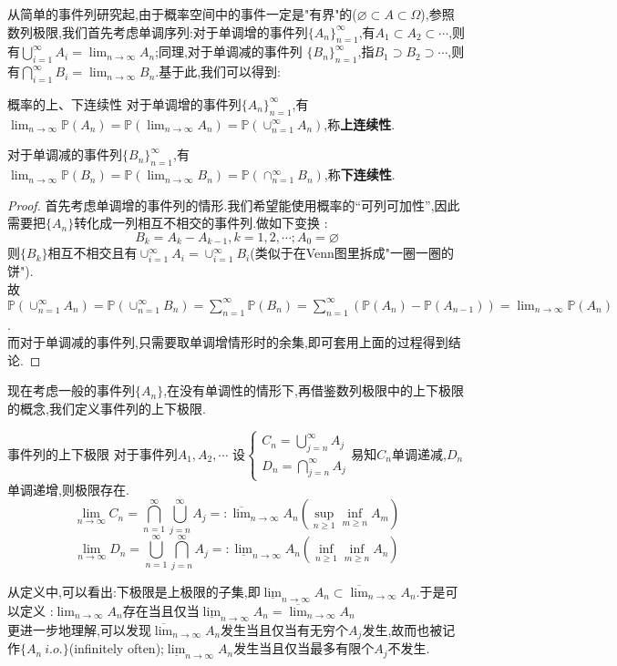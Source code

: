 \documentclass[lang=cn,10pt]{elegantbook}
\begin{document}
从简单的事件列研究起,由于概率空间中的事件一定是"有界"的($\varnothing \subset A\subset \Omega$),参照数列极限,我们首先考虑单调序列:对于单调增的事件列$\{A_n\}_{n=1}^{\infty}$,有$A_1\subset A_2\subset \cdots$,则有$\bigcup_{i=1}^{\infty}A_i=\lim_{n\to\infty}A_n$;同理,对于单调减的事件列
$\{B_n\}_{n=1}^{\infty}$,指$B_1\supset B_2\supset \cdots$,则有$\bigcap_{i=1}^{\infty}B_i=\lim_{n\to\infty}B_n$.基于此,我们可以得到:
\begin{theorem}{概率的上、下连续性}{}
    对于单调增的事件列$\{A_n\}_{n=1}^{\infty}$,有$\lim_{n\to\infty}\mathbb{P}(A_n)=\mathbb{P}(\lim_{n\to\infty}A_n)=\mathbb{P}(\cup_{n=1}^{\infty}A_n)$,称\textbf{上连续性}.

    对于单调减的事件列$\{B_n\}_{n=1}^{\infty}$,有$\lim_{n\to\infty}\mathbb{P}(B_n)=\mathbb{P}(\lim_{n\to\infty}B_n)=\mathbb{P}(\cap_{n=1}^{\infty}B_n)$,称\textbf{下连续性}.
\end{theorem}
\begin{proof}
    首先考虑单调增的事件列的情形.我们希望能使用概率的“可列可加性”,因此需要把$\{A_n\}$转化成一列相互不相交的事件列.做如下变换 :
    $$B_k=A_k-A_{k-1},k=1,2,\cdots;A_0=\varnothing$$
    则$\{B_k\}$相互不相交且有$\cup_{i=1}^{\infty}{A_i}=\cup_{i=1}^{\infty}B_i$(类似于在Venn图里拆成"一圈一圈的饼").\\
    故$\mathbb{P}(\cup_{n=1}^{\infty}A_n)=\mathbb{P}(\cup_{n=1}^{\infty}B_n)=\sum_{n=1}^{\infty}\mathbb{P}(B_n)=\sum_{n=1}^{\infty}(\mathbb{P}(A_{n})-\mathbb{P}(A_{n-1}))=\lim_{n\to\infty}\mathbb{P}(A_n)$.\\
    而对于单调减的事件列,只需要取单调增情形时的余集,即可套用上面的过程得到结论.
\end{proof}

现在考虑一般的事件列$\{A_n\}$,在没有单调性的情形下,再借鉴数列极限中的上下极限的概念,我们定义事件列的上下极限.
\begin{definition}{事件列的上下极限}{}
    对于事件列$A_1,A_2,\cdots$
    设$\left\{\begin{aligned}C_n=\bigcup_{j=n}^{\infty}A_j\\D_n=\bigcap_{j=n}^{\infty}A_j\end{aligned}\right.$易知$C_n$单调递减,$D_n$单调递增,则极限存在.
   $$\lim_{n\to\infty}C_n=\bigcap_{n=1}^{\infty}\bigcup_{j=n}^{\infty}A_j=:\overline{\lim}_{n\to \infty}A_n(\sup_{n\geq 1}\inf_{m\geq n}A_m)$$ 
   $$\lim_{n\to\infty}D_n=\bigcup_{n=1}^{\infty}\bigcap_{j=n}^{\infty}A_j=:\underline{\lim}_{n\to\infty}A_n(\inf_{n\geq 1}\inf_{m\geq n}A_n)$$
\end{definition}
从定义中,可以看出:下极限是上极限的子集,即$\underline{\lim}_{n\to\infty}A_n\subset \overline{\lim}_{n\to \infty}A_n$.于是可以定义 :$\lim_{n\to\infty}A_n$存在当且仅当$\underline{\lim}_{n\to\infty}A_n=\overline{\lim}_{n\to \infty}A_n$\\
更进一步地理解,可以发现$\overline{\lim}_{n\to \infty}A_n$发生当且仅当有无穷个$A_j$发生,故而也被记作$\{A_n\ i.o.\}$(infinitely often);$\underline{\lim}_{n\to\infty}A_n$发生当且仅当最多有限个$A_j$不发生.
\end{document}

